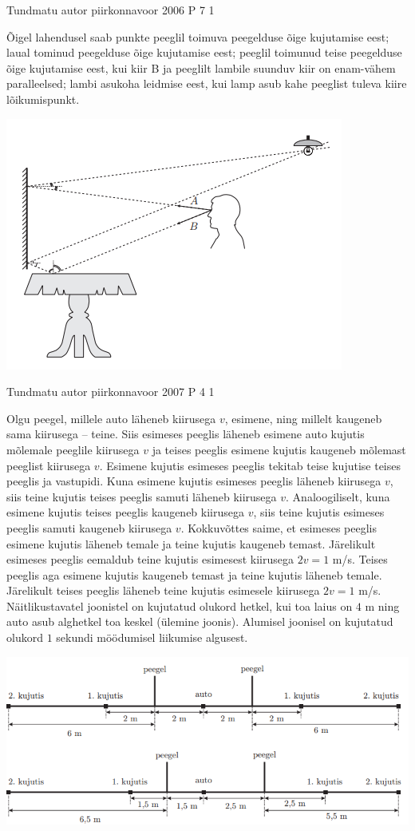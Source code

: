 \documentclass[11pt]{article}
\begin{document}
{%
{Tundmatu autor} %
{piirkonnavoor} %
{2006} %
{P 7} %
{1} %
{

\ifSolution
Õigel lahendusel saab punkte peeglil toimuva peegelduse õige kujutamise eest; laual tominud peegelduse õige kujutamise eest; peeglil toimunud teise peegelduse õige kujutamise eest, kui kiir B ja peeglilt lambile suunduv kiir on enam-vähem paralleelsed; lambi asukoha leidmise eest, kui lamp asub kahe peeglist tuleva kiire lõikumispunkt.
\begin{center}
	\includegraphics[width=0.5\linewidth]{2006-v2p-07-lah.PNG}
\end{center}
\fi
}


{Tundmatu autor} %
{piirkonnavoor} %
{2007} %
{P 4} %
{1} %
{

\ifSolution
Olgu peegel, millele auto läheneb kiirusega $v$, esimene, ning millelt kaugeneb sama kiirusega – teine. Siis esimeses peeglis läheneb esimene auto kujutis mõlemale peeglile kiirusega $v$ ja teises peeglis esimene kujutis kaugeneb mõlemast peeglist kiirusega $v$. Esimene kujutis esimeses peeglis tekitab teise kujutise teises peeglis ja vastupidi. Kuna esimene kujutis esimeses peeglis läheneb kiirusega $v$, siis teine kujutis teises peeglis samuti läheneb kiirusega $v$. Analoogiliselt, kuna esimene kujutis teises peeglis kaugeneb kiirusega $v$, siis teine kujutis esimeses peeglis samuti kaugeneb kiirusega $v$. Kokkuvõttes saime, et esimeses peeglis esimene kujutis läheneb temale ja teine kujutis kaugeneb temast. Järelikult esimeses peeglis eemaldub teine kujutis esimesest kiirusega $2v = 1$ m/s. Teises peeglis aga esimene kujutis kaugeneb temast ja teine kujutis läheneb temale. Järelikult teises peeglis läheneb teine kujutis esimesele kiirusega $2v = 1$ m/s. Näitlikustavatel joonistel on kujutatud olukord hetkel, kui toa laius on $4$ m ning auto asub alghetkel toa keskel (ülemine joonis). Alumisel joonisel on kujutatud olukord $1$ sekundi möödumisel liikumise algusest.
\begin{center}
	\includegraphics[width=0.5\linewidth]{2007-v2p-04-lah.PNG}
\end{center}
\fi
}


}
\end{document}
